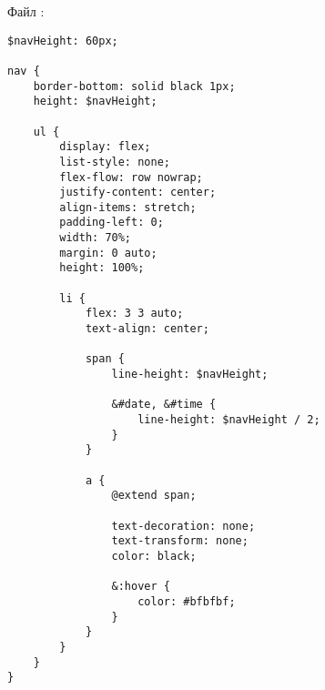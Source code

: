 \documentclass[a4paper,14pt]{extarticle}
\begin{document}
Файл :

\begin{lstlisting}
$navHeight: 60px;

nav {
    border-bottom: solid black 1px;
    height: $navHeight;

    ul {
        display: flex;
        list-style: none;
        flex-flow: row nowrap;
        justify-content: center;
        align-items: stretch;
        padding-left: 0;
        width: 70%;
        margin: 0 auto;
        height: 100%;

        li {
            flex: 3 3 auto;
            text-align: center;

            span {
                line-height: $navHeight;

                &#date, &#time {
                    line-height: $navHeight / 2;
                }
            }

            a {
                @extend span;

                text-decoration: none;
                text-transform: none;
                color: black;

                &:hover {
                    color: #bfbfbf;
                }
            }
        }
    }
}
\end{lstlisting}
\end{document}
